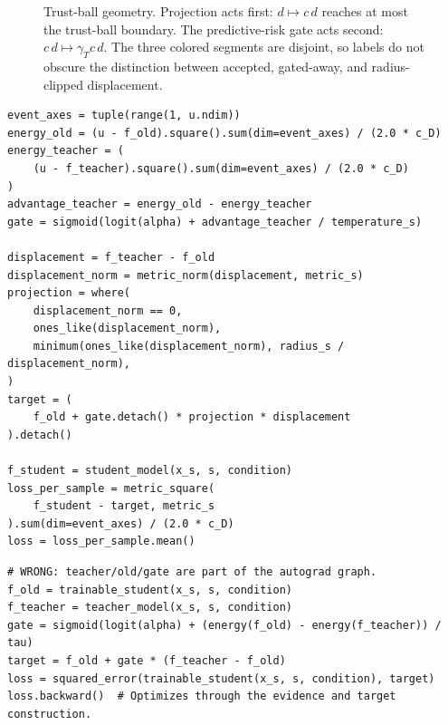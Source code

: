 \documentclass[11pt,a4paper]{article}
\theoremstyle{plain}
\theoremstyle{definition}
\begin{document}
\begin{figure}[htbp]
\caption{Trust-ball geometry.  Projection acts first:
$d\mapsto c\,d$ reaches at most the trust-ball boundary.  The predictive-risk gate acts second:
$c\,d\mapsto\gamma_Tc\,d$.  The three colored segments are disjoint, so labels do not obscure
the distinction between accepted, gated-away, and radius-clipped displacement.}
\label{fig:trust-ball}
\end{figure}

\begin{lstlisting}[style=goodpython,caption={Good conceptual detached gate, projection, and student-only regression.}]
event_axes = tuple(range(1, u.ndim))
energy_old = (u - f_old).square().sum(dim=event_axes) / (2.0 * c_D)
energy_teacher = (
    (u - f_teacher).square().sum(dim=event_axes) / (2.0 * c_D)
)
advantage_teacher = energy_old - energy_teacher
gate = sigmoid(logit(alpha) + advantage_teacher / temperature_s)

displacement = f_teacher - f_old
displacement_norm = metric_norm(displacement, metric_s)
projection = where(
    displacement_norm == 0,
    ones_like(displacement_norm),
    minimum(ones_like(displacement_norm), radius_s / displacement_norm),
)
target = (
    f_old + gate.detach() * projection * displacement
).detach()

f_student = student_model(x_s, s, condition)
loss_per_sample = metric_square(
    f_student - target, metric_s
).sum(dim=event_axes) / (2.0 * c_D)
loss = loss_per_sample.mean()
\end{lstlisting}

\begin{lstlisting}[style=badpython,caption={Bad: gradient leakage makes the gate and target gameable.}]
# WRONG: teacher/old/gate are part of the autograd graph.
f_old = trainable_student(x_s, s, condition)
f_teacher = teacher_model(x_s, s, condition)
gate = sigmoid(logit(alpha) + (energy(f_old) - energy(f_teacher)) / tau)
target = f_old + gate * (f_teacher - f_old)
loss = squared_error(trainable_student(x_s, s, condition), target)
loss.backward()  # Optimizes through the evidence and target construction.
\end{lstlisting}
\end{document}
